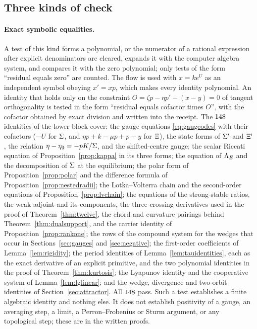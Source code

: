 \subsection{Three kinds of check}\label{num:sec:classes}
\paragraph{Exact symbolic equalities.}
A test of this kind forms a polynomial, or the numerator of a rational expression after explicit denominators are cleared, expands it with the computer algebra system, and compares it with the zero polynomial; only tests of the form ``residual equals zero'' are counted. The flow is used with $x=ke^U$ as an independent symbol obeying $x'=xp$, which makes every identity polynomial. An identity that holds only on the constraint $O=\zeta p-\eta p'-(x-y)=0$ of tangent orthogonality is tested in the form ``residual equals cofactor times $O$'', with the cofactor obtained by exact division and written into the receipt. The $148$ identities of the lower block cover: the gauge equations \eqref{eq:gaugeodes} with their cofactors ($-U$ for $\Sigma$, and $\eta p+k-\mu p+p-y$ for $\Xi$), the state forms of $\Sigma'$ and $\Xi'$, the relation $\eta-\eta_0=-pK/\Sigma$, and the shifted-centre gauge; the scalar Riccati equation of Proposition~\ref{prop:kappa} in its three forms; the equation of $\Lambda_E$ and the decomposition of $\Sigma$ at the equilibrium; the polar form of Proposition~\ref{prop:polar} and the difference formula of Proposition~\ref{prop:nestedradii}; the Lotka--Volterra chain and the second-order equations of Proposition~\ref{prop:lvchain}; the equations of the strong-stable ratios, the weak adjoint and its components, the three crossing derivatives used in the proof of Theorem~\ref{thm:twelve}, the chord and curvature pairings behind Theorem~\ref{thm:dualsupport}, and the carrier identity of Proposition~\ref{prop:rankone}; the rows of the compound system for the wedges that occur in Sections~\ref{sec:gauges} and \ref{sec:negative}; the first-order coefficients of Lemma~\ref{lem:rigidity}; the period identities of Lemma~\ref{lem:tauidentities}, each as the exact derivative of an explicit primitive, and the two polynomial identities in the proof of Theorem~\ref{thm:kurtosis}; the Lyapunov identity and the cooperative system of Lemma~\ref{lem:lglinear}; and the wedge, divergence and two-orbit identities of Section~\ref{sec:attractor}. All $148$ pass. Such a test establishes a finite algebraic identity and nothing else. It does not establish positivity of a gauge, an averaging step, a limit, a Perron--Frobenius or Sturm argument, or any topological step; these are in the written proofs.

